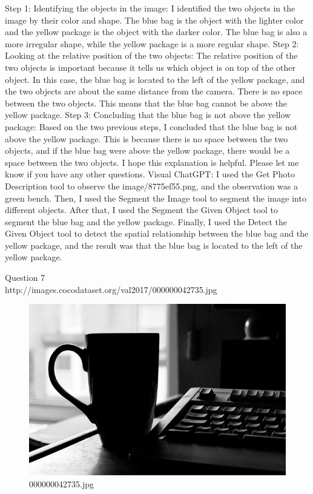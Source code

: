 \begin{enumerate}
        Step 1: Identifying the objects in the image: I identified the two objects in the image by their color and shape. The blue bag is the object with the lighter color and the yellow package is the object with the darker color. The blue bag is also a more irregular shape, while the yellow package is a more regular shape.
        Step 2: Looking at the relative position of the two objects: The relative position of the two objects is important because it tells us which object is on top of the other object. In this case, the blue bag is located to the left of the yellow package, and the two objects are about the same distance from the camera. There is no space between the two objects. This means that the blue bag cannot be above the yellow package.
        Step 3: Concluding that the blue bag is not above the yellow package: Based on the two previous steps, I concluded that the blue bag is not above the yellow package. This is because there is no space between the two objects, and if the blue bag were above the yellow package, there would be a space between the two objects.
        I hope this explanation is helpful. Please let me know if you have any other questions.
        \subitem Visual ChatGPT: I used the Get Photo Description tool to observe the image/8775ef55.png, and the observation was a green bench. Then, I used the Segment the Image tool to segment the image into different objects. After that, I used the Segment the Given Object tool to segment the blue bag and the yellow package. Finally, I used the Detect the Given Object tool to detect the spatial relationship between the blue bag and the yellow package, and the result was that the blue bag is located to the left of the yellow package.
    \end{enumerate}
Question 7\\
http://images.cocodataset.org/val2017/000000042735.jpg
    \begin{figure}[h]
        \centering
        \includegraphics[width=0.8\linewidth]{../image set/easy/000000042735.jpg}
        \caption{000000042735.jpg}
    \end{figure}
